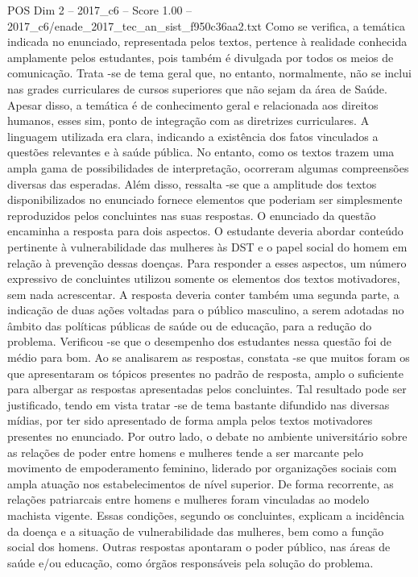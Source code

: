 \begin{textsample}{POS Dim 2 – 2017\_c6 – Score 1.00 – 2017\_c6/enade\_2017\_tec\_an\_sist\_f950c36aa2.txt}
Como se verifica, a temática indicada no enunciado, representada pelos textos, pertence à realidade conhecida amplamente pelos estudantes, pois também é divulgada por todos os meios de comunicação.
Trata -se de tema geral que, no entanto, normalmente, não se inclui nas grades curriculares de cursos superiores que não sejam da área de Saúde.
Apesar disso, a temática é de conhecimento geral e relacionada aos direitos humanos, esses sim, ponto de integração com as diretrizes curriculares.
A linguagem utilizada era clara, indicando a existência dos fatos vinculados a questões relevantes e à saúde pública.
No entanto, como os textos trazem uma ampla gama de possibilidades de interpretação, ocorreram algumas compreensões diversas das esperadas.
Além disso, ressalta -se que a amplitude dos textos disponibilizados no enunciado fornece elementos que poderiam ser simplesmente reproduzidos pelos concluintes nas suas respostas.
O enunciado da questão encaminha a resposta para dois aspectos.
O estudante deveria abordar conteúdo pertinente à vulnerabilidade das mulheres às DST e o papel social do homem em relação à prevenção dessas doenças.
Para responder a esses aspectos, um número expressivo de concluintes utilizou somente os elementos dos textos motivadores, sem nada acrescentar.
A resposta deveria conter também uma segunda parte, a indicação de duas ações voltadas para o público masculino, a serem adotadas no âmbito das políticas públicas de saúde ou de educação, para a redução do problema.
Verificou -se que o desempenho dos estudantes nessa questão foi de médio para bom.
Ao se analisarem as respostas, constata -se que muitos foram os que apresentaram os tópicos presentes no padrão de resposta, amplo o suficiente para albergar as respostas apresentadas pelos concluintes.
Tal resultado pode ser justificado, tendo em vista tratar -se de tema bastante difundido nas diversas mídias, por ter sido apresentado de forma ampla pelos textos motivadores presentes no enunciado.
Por outro lado, o debate no ambiente universitário sobre as relações de poder entre homens e mulheres tende a ser marcante pelo movimento de empoderamento feminino, liderado por organizações sociais com ampla atuação nos estabelecimentos de nível superior.
De forma recorrente, as relações patriarcais entre homens e mulheres foram vinculadas ao modelo machista vigente.
Essas condições, segundo os concluintes, explicam a incidência da doença e a situação de vulnerabilidade das mulheres, bem como a função social dos homens.
Outras respostas apontaram o poder público, nas áreas de saúde e/ou educação, como órgãos responsáveis pela solução do problema.

\end{textsample}
